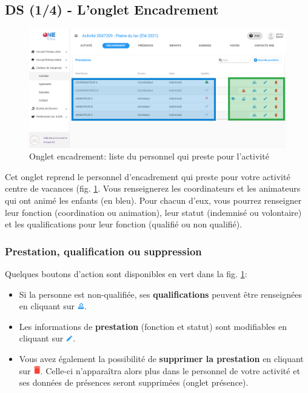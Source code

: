 \subsection{DS (1/4) - L'onglet Encadrement}\label{encadrementcdv}

\begin{figure}[h!]
    \centering
    \includegraphics[width=15cm]{Images/cdv/cdv-ds-encadrement2.png}
    \caption{Onglet encadrement: liste du personnel qui preste pour l'activité}
    \label{fig:cdv_encadrement}
\end{figure}

Cet onglet reprend le personnel d'encadrement qui preste pour  votre activité centre de vacances (fig. \ref{fig:cdv_encadrement}. Vous renseignerez les coordinateurs et les animateurs qui ont animé les enfants (en \textcolor{bleu}{bleu}). Pour chacun d'eux, vous pourrez renseigner leur fonction (coordination ou animation), leur statut (indemnisé ou volontaire) et les qualifications pour leur fonction (qualifié ou non qualifié).

\subsubsection{Prestation, qualification ou suppression}
Quelques boutons d'action sont disponibles en \textcolor{vert}{vert} dans la fig. \ref{fig:cdv_encadrement}:

\begin{itemize}
    \item Si la personne est non-qualifiée, ses \textbf{qualifications} peuvent être renseignées en cliquant sur \includegraphics[width=0.3cm]{Images/icon/button_dmd_qualif.png}.
    \item Les informations de \textbf{prestation} (fonction et statut) sont modifiables en cliquant sur \includegraphics[width=0.3cm]{Images/icon/button_modif.png}.
    \item Vous avez également la possibilité de \textbf{supprimer la prestation} en cliquant sur \includegraphics[width=0.3cm]{Images/icon/icon-del.png}. Celle-ci n'apparaîtra alors plus dans le personnel de votre activité et ses données de présences seront supprimées (onglet présence).
\end{itemize} 


